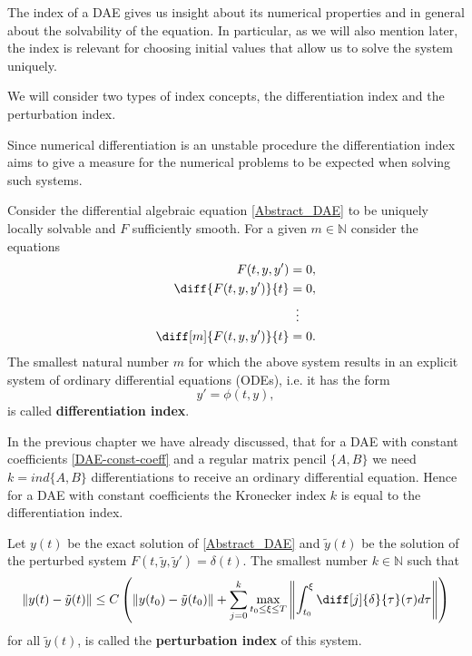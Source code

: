 The index of a DAE gives us insight about its numerical properties and in general about the solvability of the equation. In particular, as we will also mention later, the index is relevant for choosing initial values that allow us to solve the system uniquely.

We will consider two types of index concepts, the differentiation index and the perturbation index.

Since numerical differentiation is an unstable procedure the differentiation index aims to give a measure for the numerical problems to be expected when solving such systems.

\begin{definition}
	Consider the differential algebraic equation \eqref{Abstract_DAE} to be uniquely locally solvable and $F$ sufficiently smooth. For a given $m \in \mathbb{N}$ consider the equations
	\begin{displaymath}
		\begin{aligned}
			F(t,y,y') &= 0, \\
			\diff{F(t,y,y')}{t} &= 0, \\
			&\vdotswithin{=} \\
			\diff[m]{F(t,y,y')}{t} &= 0.
		\end{aligned}
	\end{displaymath}
	The smallest natural number $m$ for which the above system results in an explicit system of ordinary differential equations (ODEs), i.e. it has the form
	\begin{displaymath}
		y' = \phi(t,y),
	\end{displaymath}
	is called \textbf{differentiation index}.
\end{definition}

In the previous chapter we have already discussed, that for a DAE with constant coefficients \eqref{DAE-const-coeff} and a regular matrix pencil $\{A,B\}$  we need $k = ind\{A,B\}$ differentiations to receive an ordinary differential equation. Hence for a DAE with constant coefficients the Kronecker index $k$ is equal to the differentiation index.

\begin{definition}
	Let $y(t)$ be the exact solution of \eqref{Abstract_DAE} and $\tilde{y}(t)$ be the solution of the perturbed system $F(t, \tilde{y}, \tilde{y}') = \delta(t)$. The smallest number $k \in \mathbb{N}$ such that 
	\begin{displaymath}
		\|y(t)-\tilde{y}(t)\| \leq C \left(\|y(t_0)-\tilde{y}(t_0)\|+\sum_{j=0}^{k}\max_{t_0 \leq \xi \leq T} \left\rVert 		\int_{t_0}^{\xi}\diff[j]{\delta}{\tau}(\tau)d \tau \right\rVert \right)
	\end{displaymath}
	for all $\tilde{y}(t)$, is called the \textbf{perturbation index} of this system.
\end{definition}	

